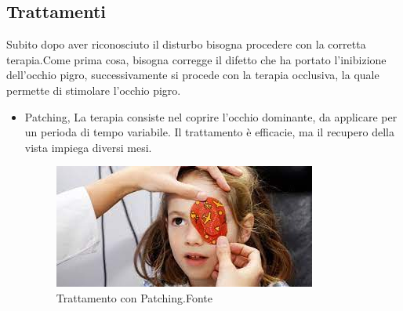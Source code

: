 \documentclass[10pt,a4paper]{article}
\begin{document}
	\subsection{Trattamenti}
	Subito dopo aver riconosciuto il disturbo bisogna procedere con la corretta terapia.Come prima cosa, bisogna corregge il difetto che ha portato l'inibizione dell'occhio pigro, successivamente si procede con la terapia occlusiva, la quale permette di stimolare l'occhio pigro.
	\begin{itemize}
		\item Patching, La terapia consiste nel coprire l'occhio dominante, da applicare per un perioda di tempo variabile.
		Il trattamento è efficacie, ma il recupero della vista impiega diversi mesi.       	   
			\begin{figure}[!h]
				\centering
				\includegraphics[width=0.8\linewidth]{image/patching}
				\caption{Trattamento con Patching.Fonte\cite{Patching_image}}
				\label{fig:patching}
			\end{figure}	
	

\end{itemize}
\end{document}
